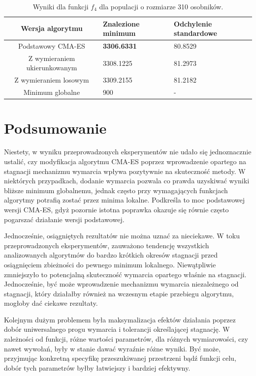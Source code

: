 \documentclass[10pt]{article}
\begin{document}
\begin{table}[H]
\centering
\begin{tabularx}{0.9\textwidth}{c|X|X}
Wersja algorytmu & Znalezione minimum & Odchylenie standardowe\\
\hline
Podstawowy CMA-ES &  \textbf{3306.6331} & 80.8529 \\
\hline
Z wymieraniem ukierunkowanym & 3308.1225 & 81.2973 \\
\hline
Z wymieraniem losowym &  3309.2155 & 81.2182\\
\hline 
\hline
Minimum globalne & 900 & -
\end{tabularx}
\caption{Wyniki dla funkcji $f_4$ dla populacji o rozmiarze 310 osobników.}
\label{tab:test-Levy}
\end{table}

\section{Podsumowanie}
Niestety, w wyniku przeprowadzonych eksperymentów nie udało się jednoznacznie ustalić, czy modyfikacja algorytmu CMA-ES poprzez wprowadzenie opartego na stagnacji mechanizmu wymarcia wpływa pozytywnie na skuteczność metody. W niektórych przypadkach, dodanie wymarcia pozwala co prawda uzyskiwać wyniki bliższe minimum globalnemu, jednak często przy wymagających funkcjach algorytmy potrafią zostać  przez minima lokalne. Podkreśla to moc podstawowej wersji CMA-ES, gdyż pozornie istotna poprawka okazuje się równie często pogarszać działanie wersji podstawowej.

Jednocześnie, osiągniętych rezultatów nie można uznać za nieciekawe. W toku przeprowadzonych eksperymentów, zauważono tendencję wszystkich analizowanych algorytmów do bardzo krótkich okresów stagnacji przed osiągnięciem zbieżności do pewnego minimum lokalnego. Niewątpliwie zmniejszyło to potencjalną skuteczność wymarcia opartego właśnie na stagnacji. Jednocześnie, być może wprowadzenie mechanizmu wymarcia niezależnego od stagnacji, który działałby również na wczesnym etapie przebiegu algorytmu, mogłoby dać ciekawe rezultaty.

Kolejnym dużym problemem była maksymalizacja efektów działania poprzez dobór uniwersalnego progu wymarcia i tolerancji określającej stagnację. W zależności od funkcji, różne wartości parametrów, dla różnych wymiarowości, czy nawet wywołań, były w stanie dawać wyraźnie różne wyniki. Być może, przyjmując konkretną specyfikę przeszukiwanej przestrzeni bądź funkcji celu, dobór tych parametrów byłby łatwiejszy i bardziej efektywny. 
\end{document}
